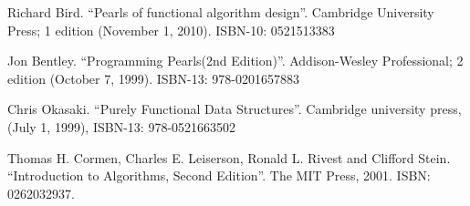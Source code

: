 \documentclass[b5paper]{article}
\begin{document}
\begin{thebibliography}{99}

Richard Bird. ``Pearls of functional algorithm design''. Cambridge University Press; 1 edition (November 1, 2010). ISBN-10: 0521513383

Jon Bentley. ``Programming Pearls(2nd Edition)''. Addison-Wesley Professional; 2 edition (October 7, 1999). ISBN-13: 978-0201657883

Chris Okasaki. ``Purely Functional Data Structures''. Cambridge university press, (July 1, 1999), ISBN-13: 978-0521663502

Thomas H. Cormen, Charles E. Leiserson, Ronald L. Rivest and Clifford Stein. ``Introduction to Algorithms, Second Edition''. The MIT Press, 2001. ISBN: 0262032937.

\end{thebibliography}

\expandafter\enddocument
\fi
\end{document}
